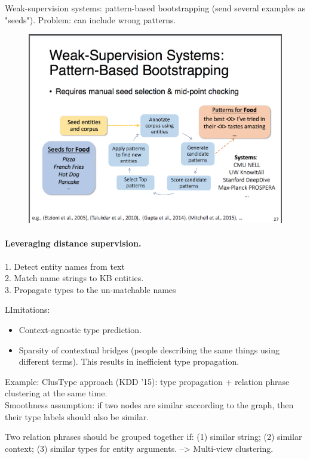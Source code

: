 Weak-supervision systems: pattern-based bootstrapping
(send several examples as "seeds"). Problem: can include wrong patterns.
\begin{figure}[h]
	\centering
	\includegraphics[scale=0.5]{fig0601/weak-supervision-ppt}
\end{figure}

\paragraph{Leveraging distance supervision.}
1. Detect entity names from text\\
2. Match name strings to KB entities.\\
3. Propagate types to the un-matchable names

LImitations:
\begin{itemize}
	\item Context-agnostic type prediction.
	\item Sparsity of contextual bridges (people describing the same things using different terms). This results in inefficient type propagation. 
\end{itemize}
Example: ClusType approach (KDD '15): type propagation + relation phrase clustering at the same time.\\
Smoothness assumption: if two nodes are similar saccording to the graph, then their type labels should also be similar.  

Two relation phrases should be grouped together if: (1) similar string; (2) similar context; (3) similar types for entity arguments. --> Multi-view clustering.


